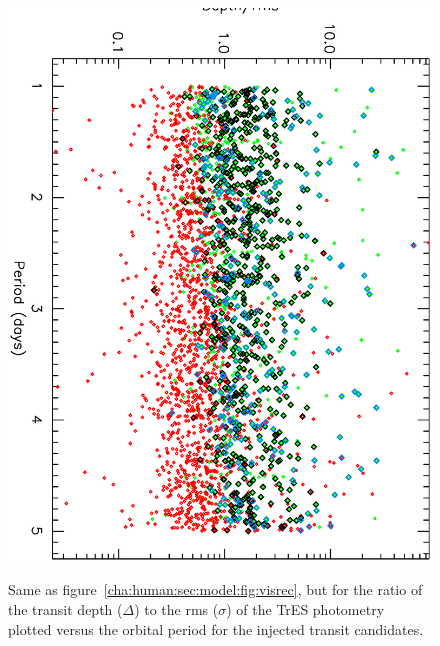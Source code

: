 \begin{figure}
\begin{center}
\centering
\includegraphics[width=.75\textwidth, angle=90]{7_visual_c} \\
\caption[$\Delta/\sigma$ versus period for visually recovered transits]{%
Same as figure~\ref{cha:human:sec:model:fig:visrec}, but for the ratio of the transit depth ($\Delta$) to the rms ($\sigma$) of the TrES photometry plotted versus the orbital period for the injected transit candidates.%
}\label{cha:human:sec:model:fig:visratiorec}
\end{center}
\end{figure}

